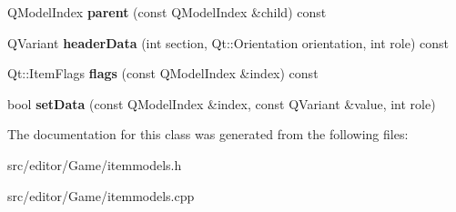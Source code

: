 \begin{DoxyCompactItemize}
\item 
\hypertarget{class_objects_tree_model_a304b4e2110a7ab9e697d1ace64885792}{\-Q\-Model\-Index {\bfseries parent} (const \-Q\-Model\-Index \&child) const }\label{class_objects_tree_model_a304b4e2110a7ab9e697d1ace64885792}

\item 
\hypertarget{class_objects_tree_model_ae8574c384005c730762b083eb3863d74}{\-Q\-Variant {\bfseries header\-Data} (int section, \-Qt\-::\-Orientation orientation, int role) const }\label{class_objects_tree_model_ae8574c384005c730762b083eb3863d74}

\item 
\hypertarget{class_objects_tree_model_a7cbd6321c7f581a088d0e93418724898}{\-Qt\-::\-Item\-Flags {\bfseries flags} (const \-Q\-Model\-Index \&index) const }\label{class_objects_tree_model_a7cbd6321c7f581a088d0e93418724898}

\item 
\hypertarget{class_objects_tree_model_a33316c0c59125afb510d7df5d62784a4}{bool {\bfseries set\-Data} (const \-Q\-Model\-Index \&index, const \-Q\-Variant \&value, int role)}\label{class_objects_tree_model_a33316c0c59125afb510d7df5d62784a4}

\end{DoxyCompactItemize}


\-The documentation for this class was generated from the following files\-:\begin{DoxyCompactItemize}
\item 
src/editor/\-Game/itemmodels.\-h\item 
src/editor/\-Game/itemmodels.\-cpp\end{DoxyCompactItemize}
